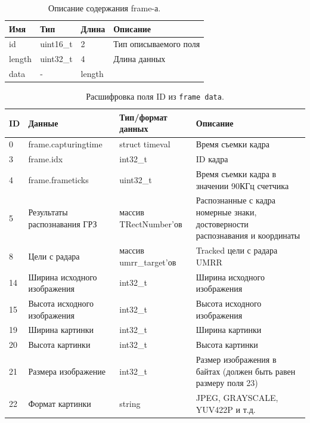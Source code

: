\documentclass[specification,annotation,times]{itmo-student-thesis}
\begin{document}
\begin{table}[!ht]
	\caption{Описание содержания frame-а.}\label{tb1:frame-type}
	\centering
	\begin{tabular}{|p{}|p{}|p{}|p{}|}\hline
		\textbf{Имя} & \textbf{Тип}	&\textbf{Длина}&	\textbf{Описание} \\\hline\hline
		id	&uint16\_t&	2 & Тип описываемого поля\\\hline
		length&	uint32\_t	&4	&Длина данных\\\hline
		data&	-	&length	 &\\\hline

	\end{tabular}
\end{table}

\begin{center}
	\begin{longtable}{|p{}|p{}|p{}|p{}|}
		\caption{Расшифровка поля ID из \texttt{frame data}.}\label{tb1:frame-data} \\ \hline
		\textbf{ID}	&\textbf{Данные}&\textbf{Тип/формат данных}&\textbf{Описание}\\\hline\hline
		0	&frame.capturingtime&	struct timeval	&Время съемки кадра\\\hline
		3	&frame.idx	&int32\_t&	ID кадра\\\hline
		4	&frame.frameticks	&uint32\_t&	Время съемки кадра в значении 90КГц счетчика\\\hline
		5	&Результаты распознавания ГРЗ	&массив TRectNumber'ов	&Распознанные с кадра номерные знаки, достоверности распознавания и координаты\\\hline
		8	&Цели с радара&	массив umrr\_target'ов&	Tracked цели с радара UMRR\\\hline
		14	&Ширина исходного изображения&	int32\_t	&Ширина исходного изображения\\\hline
		15	&Высота исходного изображения	&int32\_t&	Высота исходного изображения\\\hline
		19&	Ширина картинки	&int32\_t	&Ширина картинки\\\hline
		20	&Высота картинки	&int32\_t&	Высота картинки\\\hline
		21	&Размера изображение&	int32\_t	&Размер изображения в байтах (должен быть равен размеру поля 23)\\\hline
		22	&Формат картинки&	string	&JPEG, GRAYSCALE, YUV422P и т.д.\\\hline

\end{longtable}
\end{center}
\end{document}
